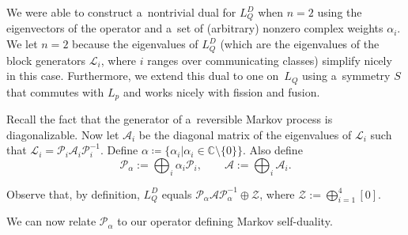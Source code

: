 \documentclass[pdftex]{sigma}
\numberwithin{equation}{section}
\theoremstyle{definition}
\begin{document}
We were able to construct a~nontrivial dual for $L_Q^D$ when $n=2$ using the eigenvectors of the operator and a~set of (arbitrary) nonzero complex weights $\alpha_i$. We let $n=2$ because the eigenvalues of $L_Q^D$ (which are the eigenvalues of the block generators $\mathcal{L}_i$, where $i$ ranges over communicating classes) simplify nicely in this case. Furthermore, we extend this dual to one on~$L_Q$ using a~symmetry $S$ that commutes with $L_p$ and works nicely with fission and fusion.

Recall the fact that the generator of a~reversible Markov process is diagonalizable. Now let $\mathcal{A}_i$ be the diagonal matrix of the eigenvalues of $\mathcal{L}_i$ such that $\mathcal{L}_i = \mathcal{P}_i \mathcal{A}_i \mathcal{P}^{-1}_i$. Define $\alpha \coloneqq \{\alpha_i | \alpha_i \in \mathbb{C} \setminus \{0\} \}$. Also define
\[\mathcal{P}_\alpha := \bigoplus_{i} \alpha_i \mathcal{P}_i,\qquad\mathcal{A} := \bigoplus_{i} \mathcal{A}_i.\]

Observe that, by definition, $L_Q^D$ equals $\mathcal{P}_\alpha \mathcal{A}\mathcal{P}_\alpha^{-1} \oplus \mathcal{Z}$, where $\mathcal{Z} := \bigoplus_{i=1}^4 [0]$.


We can now relate $\mathcal{P}_\alpha$ to our operator defining Markov self-duality.
\end{document}
